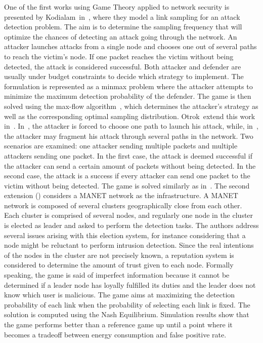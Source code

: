  One of the first works using Game Theory applied to network security is presented by Kodialam~\etal in~\cite{MuraliKodialam2003}, where they model a link sampling for an attack detection problem.
 The aim is to determine the sampling frequency that will optimize the chances of detecting an attack going through the network.
 An attacker launches attacks from a single node and chooses one out of several paths to reach the victim's node.
 If one packet reaches the victim without being detected, the attack is considered successful.
 Both attacker and defender are usually under budget constraints to decide which strategy to implement.
 The formulation is represented as a minmax problem where the attacker attempts to minimize the maximum detection probability of the defender.
 The game is then solved using the max-flow algorithm~\cite{maxflow}, which determines the attacker's strategy as well as the corresponding optimal sampling distribution.
 Otrok~\etal extend this work in~\cite{otrok1,otrok2}.
 In~\cite{MuraliKodialam2003}, the attacker is forced to choose one path to launch his attack, while, in~\cite{otrok1}, the attacker may fragment his attack through several paths in the network.
 Two scenarios are examined: one attacker sending multiple packets and multiple attackers sending one packet.
 In the first case, the attack is deemed successful if the attacker can send a certain amount of packets without being detected.
 In the second case, the attack is a success if every attacker can send one packet to the victim without being detected.
 The game is solved similarly as in~\cite{MuraliKodialam2003}.
 The second extension (\cite{otrok2}) considers a MANET network as the infrastructure.
 A MANET network is composed of several clusters geographically close from each other.
 Each cluster is comprised of several nodes, and regularly one node in the cluster is elected as leader and asked to perform the detection tasks. The authors address several issues arising with this election system, for instance considering that a node might be reluctant to perform intrusion detection.
 Since the real intentions of the nodes in the cluster are not precisely known, a reputation system is considered to determine the amount of trust given to each node.
 Formally speaking, the game is said of imperfect information because it cannot be determined if a leader node has loyally fulfilled its duties and the leader does not know which user is malicious. 
 The game aims at maximizing the detection probability of each link when the probability of selecting each link is fixed. The solution is computed using the Nash Equilibrium.
 Simulation results show that the game performs better than a reference game up until a point where it becomes a tradeoff between energy consumption and false positive rate.
 
